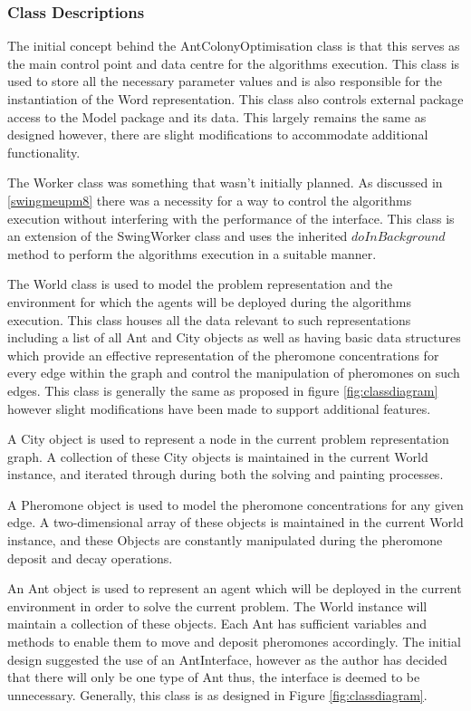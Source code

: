 \subsubsection{Class Descriptions}
\label{model:classdef}

The initial concept behind the AntColonyOptimisation class is that this serves as the main control point and data centre for the algorithms execution. This class is used to store all the necessary parameter values and is also responsible for the instantiation of the Word representation. This class also controls external package access to the Model package and its data. This largely remains the same as designed however, there are slight modifications to accommodate additional functionality.

The Worker class was something that wasn’t initially planned. As discussed in \ref{swingmeupm8} there was a necessity for a way to control the algorithms execution without interfering with the performance of the interface. This class is an extension of the SwingWorker class and uses the inherited $doInBackground$ method to perform the algorithms execution in a suitable manner. 

The World class is used to model the problem representation and the environment for which the agents will be deployed during the algorithms execution. This class houses all the data relevant to such representations including a list of all Ant and City objects as well as having basic data structures which provide an effective representation of the pheromone concentrations for every edge within the graph and control the manipulation of pheromones on such edges. This class is generally the same as proposed in figure \ref{fig:classdiagram} however slight modifications have been made to support additional features.

A City object is used to represent a node in the current problem representation graph. A collection of these City objects is maintained in the current World instance, and iterated through during both the solving and painting processes.

A Pheromone object is used to model the pheromone concentrations for any given edge. A two-dimensional array of these objects is maintained in the current World instance, and these Objects are constantly manipulated during the pheromone deposit and decay operations. 

An Ant object is used to represent an agent which will be deployed in the current environment in order to solve the current problem. The World instance will maintain a collection of these objects. Each Ant has sufficient variables and methods to enable them to move and deposit pheromones accordingly. The initial design suggested the use of an AntInterface, however as the author has decided that there will only be one type of Ant thus, the interface is deemed to be unnecessary. Generally, this class is as designed in Figure \ref{fig:classdiagram}.


